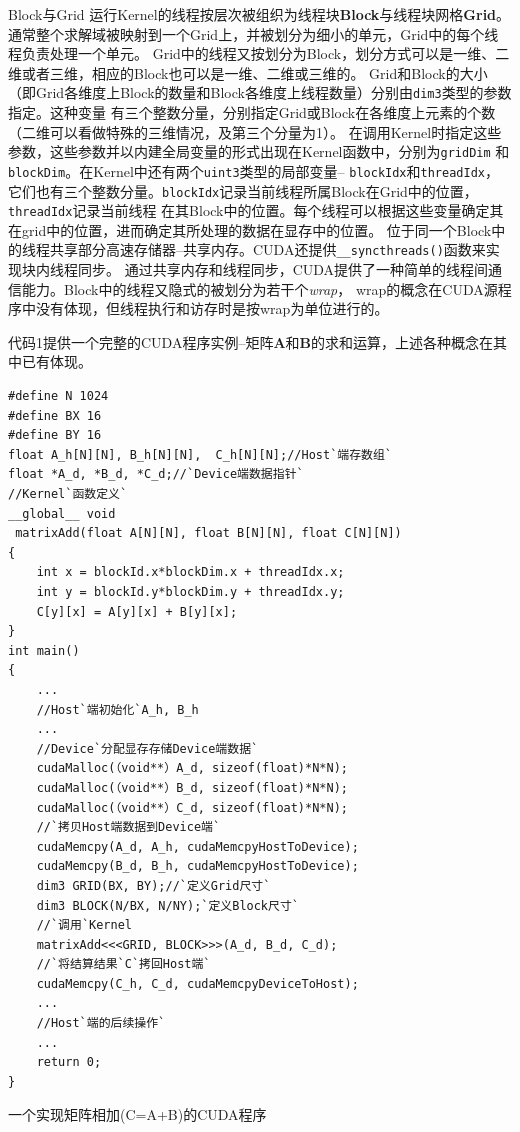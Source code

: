 \begin{myDescription}
\item[Block与Grid] 运行Kernel的线程按层次被组织为线程块\textbf{Block}与线程块网格\textbf{Grid}。
  通常整个求解域被映射到一个Grid上，并被划分为细小的单元，Grid中的每个线程负责处理一个单元。
  Grid中的线程又按划分为Block，划分方式可以是一维、二维或者三维，相应的Block也可以是一维、二维或三维的。
  Grid和Block的大小（即Grid各维度上Block的数量和Block各维度上线程数量）分别由\verb+dim3+类型的参数指定。这种变量
  有三个整数分量，分别指定Grid或Block在各维度上元素的个数（二维可以看做特殊的三维情况，及第三个分量为1）。
  在调用Kernel时指定这些参数，这些参数并以内建全局变量的形式出现在Kernel函数中，分别为\verb+gridDim+
  和\verb+blockDim+。在Kernel中还有两个\verb+uint3+类型的局部变量\--- \verb+blockIdx+和\verb+threadIdx+，
  它们也有三个整数分量。\verb+blockIdx+记录当前线程所属Block在Grid中的位置，\verb+threadIdx+记录当前线程
  在其Block中的位置。每个线程可以根据这些变量确定其在grid中的位置，进而确定其所处理的数据在显存中的位置。
  位于同一个Block中的线程共享部分高速存储器\---共享内存。CUDA还提供\verb+__syncthreads()+函数来实现块内线程同步。
  通过共享内存和线程同步，CUDA提供了一种简单的线程间通信能力。Block中的线程又隐式的被划分为若干个\textit{wrap}，
  wrap的概念在CUDA源程序中没有体现，但线程执行和访存时是按wrap为单位进行的。
\end{myDescription} 

代码1提供一个完整的CUDA程序实例\---矩阵$\bm A$和$\bm B$的求和运算，上述各种概念在其中已有体现。
\begin{Code}
\begin{lstlisting}
#define N 1024
#define BX 16
#define BY 16
float A_h[N][N], B_h[N][N],  C_h[N][N];//Host`端存数组` 
float *A_d, *B_d, *C_d;//`Device端数据指针`
//Kernel`函数定义`
__global__ void
 matrixAdd(float A[N][N], float B[N][N], float C[N][N]) 
{
	int x = blockId.x*blockDim.x + threadIdx.x;
	int y = blockId.y*blockDim.y + threadIdx.y;
	C[y][x] = A[y][x] + B[y][x];
}  
int main()
{
	...
	//Host`端初始化`A_h, B_h
	...
	//Device`分配显存存储Device端数据`
	cudaMalloc(（void**）A_d, sizeof(float)*N*N);
	cudaMalloc(（void**）B_d, sizeof(float)*N*N);
	cudaMalloc(（void**）C_d, sizeof(float)*N*N);
	//`拷贝Host端数据到Device端`
	cudaMemcpy(A_d, A_h, cudaMemcpyHostToDevice);
	cudaMemcpy(B_d, B_h, cudaMemcpyHostToDevice);
	dim3 GRID(BX, BY);//`定义Grid尺寸`
	dim3 BLOCK(N/BX, N/NY);`定义Block尺寸`
	//`调用`Kernel
	matrixAdd<<<GRID, BLOCK>>>(A_d, B_d, C_d);
	//`将结算结果`C`拷回Host端`
	cudaMemcpy(C_h, C_d, cudaMemcpyDeviceToHost);
	...
	//Host`端的后续操作`
	...
	return 0;
} 
\end{lstlisting}  
\caption{一个实现矩阵相加(C=A+B)的CUDA程序}
\end{Code}


